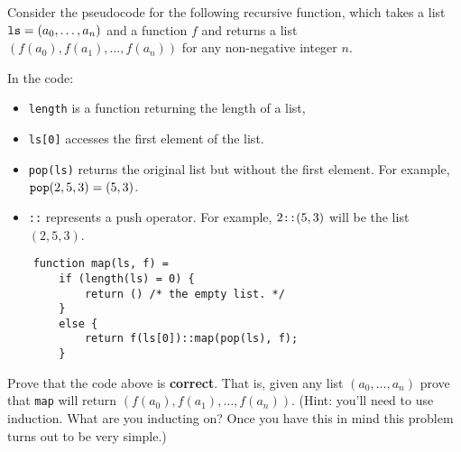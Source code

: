 Consider the pseudocode for the following recursive function, which takes a list $\verb|ls| = (a_0, \dots, a_n)$ and a function $f$ and returns a list $(f(a_0), f(a_1), \dots, f(a_n))$ for any non-negative integer $n$.

In the code:
\begin{itemize}
    \item \verb|length| is a function returning the length of a list,
    \item \verb|ls[0]| accesses the first element of the list.
    \item \verb|pop(ls)| returns the original list but without the first element. For example, $\verb|pop|(2, 5, 3) = (5, 3)$.
    \item \verb|::| represents a push operator. For example, $2\verb|::|(5, 3)$ will be the list $(2, 5, 3)$.
\end{itemize}

\begin{verbatim}
    function map(ls, f) =
        if (length(ls) = 0) {
            return () /* the empty list. */
        }
        else {
            return f(ls[0])::map(pop(ls), f);
        }
\end{verbatim}

Prove that the code above is \textbf{correct}. That is, given any list $(a_0, \dots, a_n)$ prove that \verb|map| will return $(f(a_0), f(a_1), \dots, f(a_n))$. (Hint: you'll need to use induction. What are you inducting on? Once you have this in mind this problem turns out to be very simple.)